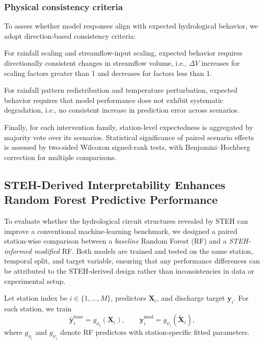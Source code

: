 \documentclass[11pt]{article}
\begin{document}
\subsubsection*{Physical consistency criteria}

To assess whether model responses align with expected hydrological behavior, we adopt direction-based consistency criteria\cite{read2019process}:

For rainfall scaling and streamflow-input scaling, expected behavior requires directionally consistent changes in streamflow volume, i.e., $\Delta V$ increases for scaling factors greater than 1 and decreases for factors less than 1\cite{nearing2021role}.

For rainfall pattern redistribution and temperature perturbation, expected behavior requires that model performance does not exhibit systematic degradation, i.e., no consistent increase in prediction error across scenarios\cite{hess-30-1077-2026}.

Finally, for each intervention family, station-level expectedness is aggregated by majority vote over its scenarios. Statistical significance of paired scenario effects is assessed by two-sided Wilcoxon signed-rank tests, with Benjamini--Hochberg correction for multiple comparisons.

\subsection{STEH-Derived Interpretability Enhances Random Forest Predictive Performance}
\label{sec:rfDesign}
To evaluate whether the hydrological circuit structures revealed by STEH can improve a conventional machine-learning benchmark, we designed a paired station-wise comparison between a \emph{baseline} Random Forest (RF) and a \emph{STEH-informed modified} RF\cite{hess-25-2997-2021}. Both models are trained and tested on the same station, temporal split, and target variable, ensuring that any performance differences can be attributed to the STEH-derived design rather than inconsistencies in data or experimental setup\cite{ABBASI2021125717}.

Let station index be $i\in\{1,\dots,M\}$, predictors $\mathbf{X}_i$, and discharge target $\mathbf{y}_i$. For each station, we train
\begin{equation}
    \hat{\mathbf{y}}^{\text{base}}_i = g_{\phi_i}(\mathbf{X}_i),
    \qquad
    \hat{\mathbf{y}}^{\text{mod}}_i = g_{\psi_i}(\widetilde{\mathbf{X}}_i),
\end{equation}
where $g_{\phi_i}$ and $g_{\psi_i}$ denote RF predictors with station-specific fitted parameters.
\end{document}
